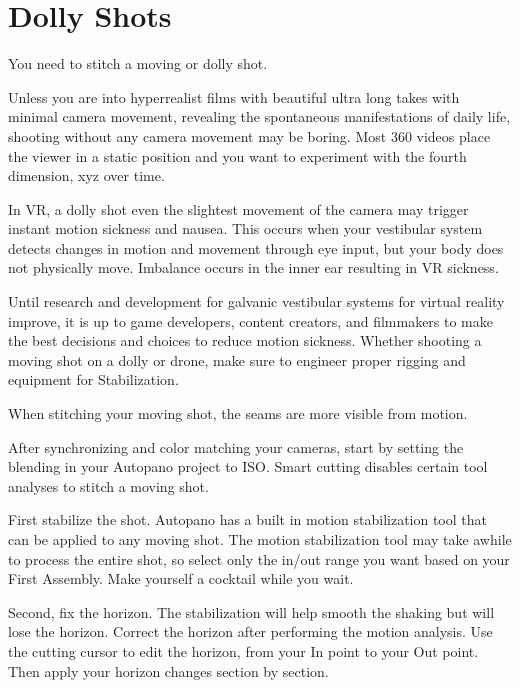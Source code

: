 \chapter{Dolly Shots}
\pagecolor{white}
\label{chap:45}
\begin{fullwidth}

\problem

{\large You need to stitch a moving or dolly shot. \par}

Unless you are into hyperrealist films with beautiful ultra long takes with minimal camera movement, revealing the spontaneous manifestations of daily life, shooting without any camera movement may be boring. Most 360 videos place the viewer in a static position and you want to experiment with the fourth dimension, xyz over time.

In VR, a dolly shot even the slightest movement of the camera may trigger instant motion sickness and nausea. This occurs when your vestibular system detects changes in motion and movement through eye input, but your body does not physically move. Imbalance occurs in the inner ear resulting in VR sickness. 

Until research and development for galvanic vestibular systems for virtual reality improve, it is up to game developers, content creators, and filmmakers to make the best decisions and choices to reduce motion sickness. Whether shooting a moving shot on a dolly or drone, make sure to engineer proper rigging and equipment for Stabilization. 

When stitching your moving shot, the seams are more visible from motion.

\clearpage
\solution

After synchronizing and color matching your cameras, start by setting the blending in your Autopano project to ISO. Smart cutting disables certain tool analyses to stitch a moving shot. 


First stabilize the shot. Autopano has a built in motion stabilization tool that can be applied to any moving shot. The motion stabilization tool may take awhile to process the entire shot, so select only the in/out range you want based on your First Assembly. Make yourself a cocktail while you wait.

\clearpage
Second, fix the horizon. The stabilization will help smooth the shaking but will lose the horizon. Correct the horizon after performing the motion analysis. Use the cutting cursor to edit the horizon, from your In point to your Out point. Then apply your horizon changes section by section.


\end{fullwidth}
